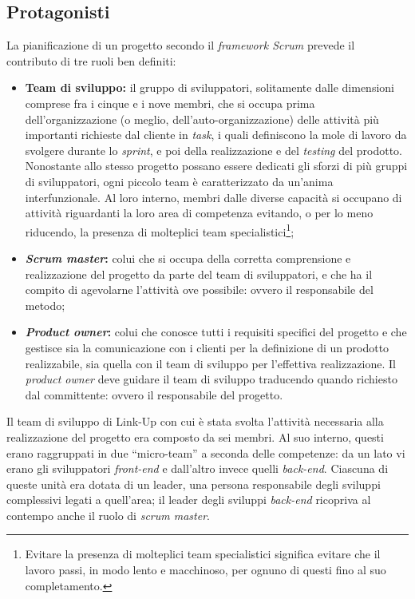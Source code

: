\subsection{Protagonisti}
La pianificazione di un progetto secondo il \textit{framework Scrum} prevede il contributo di tre ruoli ben definiti:
\begin{itemize}
  \item \textbf{Team di sviluppo:} il gruppo di sviluppatori, solitamente dalle dimensioni comprese fra i cinque e i nove membri, che si occupa prima dell'organizzazione (o meglio, dell'auto-organizzazione) delle attività più importanti richieste dal cliente in \textit{task}, i quali definiscono la mole di lavoro da svolgere durante lo \textit{sprint}, e poi della realizzazione e del \textit{testing} del prodotto.\\
  Nonostante allo stesso progetto possano essere dedicati gli sforzi di più gruppi di sviluppatori, ogni piccolo team è caratterizzato da un'anima interfunzionale. Al loro interno, membri dalle diverse capacità si occupano di attività riguardanti la loro area di competenza evitando, o per lo meno riducendo, la presenza di molteplici team specialistici\footnote{Evitare la presenza di molteplici team specialistici significa evitare che il lavoro passi, in modo lento e macchinoso, per ognuno di questi fino al suo completamento.};
  
  \item \textbf{\textit{Scrum master}:} colui che si occupa della corretta comprensione e realizzazione del progetto da parte del team di sviluppatori, e che ha il compito di agevolarne l'attività ove possibile: ovvero il responsabile del metodo;
  
  \item \textbf{\textit{Product owner}:} colui che conosce tutti i requisiti specifici del progetto e che gestisce sia la comunicazione con i clienti per la definizione di un prodotto realizzabile, sia quella con il team di sviluppo per l'effettiva realizzazione. Il \textit{product owner} deve guidare il team di sviluppo traducendo quando richiesto dal committente: ovvero il responsabile del progetto.
\end{itemize}

Il team di sviluppo di Link-Up con cui è stata svolta l'attività necessaria alla realizzazione del progetto era composto da sei membri. Al suo interno, questi erano raggruppati in due “micro-team” a seconda delle competenze: da un lato vi erano gli sviluppatori \textit{front-end} e dall'altro invece quelli \textit{back-end}. Ciascuna di queste unità era dotata di un leader, una persona responsabile degli sviluppi complessivi legati a quell'area; il leader degli sviluppi \textit{back-end} ricopriva al contempo anche il ruolo di \textit{scrum master}.

